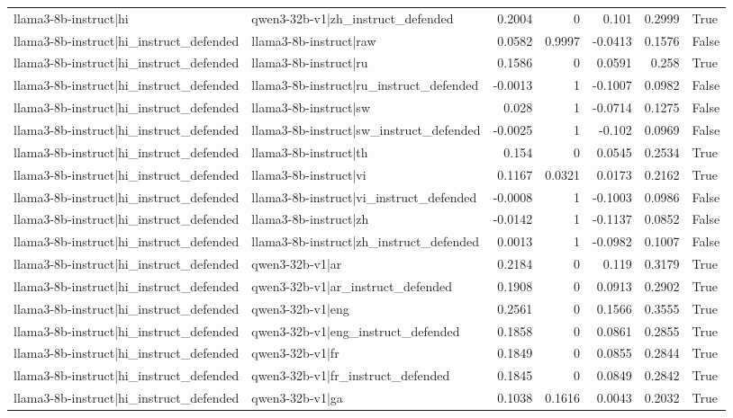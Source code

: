 \begin{table}
\begin{tabular}{l l r r r r l}
llama3-8b-instruct|hi & qwen3-32b-v1|zh_instruct_defended & 0.2004 & 0 & 0.101 & 0.2999 & True \\
llama3-8b-instruct|hi_instruct_defended & llama3-8b-instruct|raw & 0.0582 & 0.9997 & -0.0413 & 0.1576 & False \\
llama3-8b-instruct|hi_instruct_defended & llama3-8b-instruct|ru & 0.1586 & 0 & 0.0591 & 0.258 & True \\
llama3-8b-instruct|hi_instruct_defended & llama3-8b-instruct|ru_instruct_defended & -0.0013 & 1 & -0.1007 & 0.0982 & False \\
llama3-8b-instruct|hi_instruct_defended & llama3-8b-instruct|sw & 0.028 & 1 & -0.0714 & 0.1275 & False \\
llama3-8b-instruct|hi_instruct_defended & llama3-8b-instruct|sw_instruct_defended & -0.0025 & 1 & -0.102 & 0.0969 & False \\
llama3-8b-instruct|hi_instruct_defended & llama3-8b-instruct|th & 0.154 & 0 & 0.0545 & 0.2534 & True \\
llama3-8b-instruct|hi_instruct_defended & llama3-8b-instruct|vi & 0.1167 & 0.0321 & 0.0173 & 0.2162 & True \\
llama3-8b-instruct|hi_instruct_defended & llama3-8b-instruct|vi_instruct_defended & -0.0008 & 1 & -0.1003 & 0.0986 & False \\
llama3-8b-instruct|hi_instruct_defended & llama3-8b-instruct|zh & -0.0142 & 1 & -0.1137 & 0.0852 & False \\
llama3-8b-instruct|hi_instruct_defended & llama3-8b-instruct|zh_instruct_defended & 0.0013 & 1 & -0.0982 & 0.1007 & False \\
llama3-8b-instruct|hi_instruct_defended & qwen3-32b-v1|ar & 0.2184 & 0 & 0.119 & 0.3179 & True \\
llama3-8b-instruct|hi_instruct_defended & qwen3-32b-v1|ar_instruct_defended & 0.1908 & 0 & 0.0913 & 0.2902 & True \\
llama3-8b-instruct|hi_instruct_defended & qwen3-32b-v1|eng & 0.2561 & 0 & 0.1566 & 0.3555 & True \\
llama3-8b-instruct|hi_instruct_defended & qwen3-32b-v1|eng_instruct_defended & 0.1858 & 0 & 0.0861 & 0.2855 & True \\
llama3-8b-instruct|hi_instruct_defended & qwen3-32b-v1|fr & 0.1849 & 0 & 0.0855 & 0.2844 & True \\
llama3-8b-instruct|hi_instruct_defended & qwen3-32b-v1|fr_instruct_defended & 0.1845 & 0 & 0.0849 & 0.2842 & True \\
llama3-8b-instruct|hi_instruct_defended & qwen3-32b-v1|ga & 0.1038 & 0.1616 & 0.0043 & 0.2032 & True \\

\end{tabular}
\end{table}
